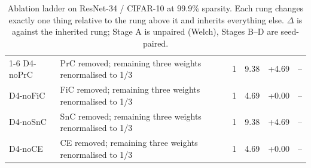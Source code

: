 \begin{table}[t]
\begin{tabular}{llrrrr}
\cmidrule(lr){1-6}
D4-noPrC & PrC removed; remaining three weights renormalised to 1/3 & 1 & 9.38 & +4.69 & -- \\
D4-noFiC & FiC removed; remaining three weights renormalised to 1/3 & 1 & 4.69 & +0.00 & -- \\
D4-noSnC & SnC removed; remaining three weights renormalised to 1/3 & 1 & 9.38 & +4.69 & -- \\
D4-noCE & CE removed; remaining three weights renormalised to 1/3 & 1 & 4.69 & +0.00 & -- \\
\bottomrule
\end{tabular}
\caption{Ablation ladder on ResNet-34 / CIFAR-10 at 99.9\% sparsity. Each rung changes exactly one thing relative to the rung above it and inherits everything else. $\Delta$ is against the inherited rung; Stage A is unpaired (Welch), Stages B--D are seed-paired. }
\label{tab:ladder}
\end{table}